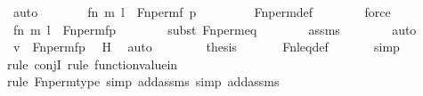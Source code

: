 \begin{isabellebody}
\ auto\isanewline
\ \ \ \ \isamarkupfalse%
\ \isamarkupfalse%
\ {\isachardoublequoteopen}{\isacharless}{\kern0pt}{\isacharless}{\kern0pt}f{\isacharbackquote}{\kern0pt}n{\isacharcomma}{\kern0pt}\ m{\isachargreater}{\kern0pt}{\isacharcomma}{\kern0pt}\ l{\isachargreater}{\kern0pt}\ {\isasymin}\ Fn{\isacharunderscore}{\kern0pt}perm{\isacharparenleft}{\kern0pt}f{\isacharcomma}{\kern0pt}\ p{\isacharparenright}{\kern0pt}{\isachardoublequoteclose}\ \isanewline
\ \ \ \ \ \ \isamarkupfalse%
\ Fn{\isacharunderscore}{\kern0pt}perm{\isacharunderscore}{\kern0pt}def\isanewline
\ \ \ \ \ \ \isamarkupfalse%
\ force\isanewline
\ \ \ \ \isamarkupfalse%
\ \isamarkupfalse%
\ {\isachardoublequoteopen}{\isacharless}{\kern0pt}{\isacharless}{\kern0pt}f{\isacharbackquote}{\kern0pt}n{\isacharcomma}{\kern0pt}\ m{\isachargreater}{\kern0pt}{\isacharcomma}{\kern0pt}\ l{\isachargreater}{\kern0pt}\ {\isasymin}\ Fn{\isacharunderscore}{\kern0pt}perm{\isacharprime}{\kern0pt}{\isacharparenleft}{\kern0pt}f{\isacharparenright}{\kern0pt}{\isacharbackquote}{\kern0pt}p{\isachardoublequoteclose}\ \isanewline
\ \ \ \ \ \ \isamarkupfalse%
{\isacharparenleft}{\kern0pt}subst\ Fn{\isacharunderscore}{\kern0pt}perm{\isacharprime}{\kern0pt}{\isacharunderscore}{\kern0pt}eq{\isacharparenright}{\kern0pt}\isanewline
\ \ \ \ \ \ \isamarkupfalse%
\ assms\isanewline
\ \ \ \ \ \ \isamarkupfalse%
\ auto\isanewline
\ \ \ \ \isamarkupfalse%
\ \isamarkupfalse%
\ {\isachardoublequoteopen}v\ {\isasymin}\ Fn{\isacharunderscore}{\kern0pt}perm{\isacharprime}{\kern0pt}{\isacharparenleft}{\kern0pt}f{\isacharparenright}{\kern0pt}{\isacharbackquote}{\kern0pt}p{\isachardoublequoteclose}\ \isamarkupfalse%
\ H\ \isamarkupfalse%
\ auto\isanewline
\ \ \isamarkupfalse%
\isanewline
\ \ \isamarkupfalse%
\ \isamarkupfalse%
\ {\isacharquery}{\kern0pt}thesis\ \isanewline
\ \ \ \ \isamarkupfalse%
\ Fn{\isacharunderscore}{\kern0pt}leq{\isacharunderscore}{\kern0pt}def\ \isanewline
\ \ \ \ \isamarkupfalse%
\ simp\ \isanewline
\ \ \ \ \isamarkupfalse%
{\isacharparenleft}{\kern0pt}rule\ conjI{\isacharcomma}{\kern0pt}\ rule\ function{\isacharunderscore}{\kern0pt}value{\isacharunderscore}{\kern0pt}in{\isacharparenright}{\kern0pt}\isanewline
\ \ \ \ \ \ \isamarkupfalse%
{\isacharparenleft}{\kern0pt}rule\ Fn{\isacharunderscore}{\kern0pt}perm{\isacharprime}{\kern0pt}{\isacharunderscore}{\kern0pt}type{\isacharcomma}{\kern0pt}\ simp\ add{\isacharcolon}{\kern0pt}assms{\isacharcomma}{\kern0pt}\ simp\ add{\isacharcolon}{\kern0pt}assms{\isacharparenright}{\kern0pt}\isanewline

\end{isabellebody}
